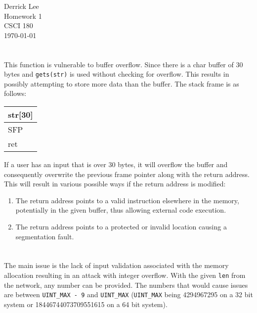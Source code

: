 \documentclass[12pt]{exam}
\begin{document}
\noindent
Derrick Lee\\
Homework 1\\
CSCI 180\\
\today\\

\section{}

This function is vulnerable to buffer overflow. Since there is a char buffer of
30 bytes and \lstinline{gets(str)} is used without checking for overflow.  This
results in possibly attempting to store more data than the buffer. The stack
frame is as follows:

\begin{table}[h]
\centering
\begin{tabular}{| l |}
\hline
str{[}30{]} \\ \hline
SFP         \\ \hline
ret         \\ \hline
\end{tabular}
\end{table}

If a user has an input that is over 30 bytes, it will overflow the buffer and
consequently overwrite the previous frame pointer along with the return address.
This will result in various possible ways if the return address is modified:

\begin{enumerate}
    \item The return address points to a valid instruction elsewhere in the
          memory, potentially in the given buffer, thus allowing external code
          execution.
    \item The return address points to a protected or invalid location causing
          a segmentation fault.
\end{enumerate}

\section{}

The main issue is the lack of input validation associated with the memory
allocation resulting in an attack with integer overflow.  With the given
\lstinline{len} from the network, any number can be provided.  The numbers that
would cause issues are between \lstinline{UINT_MAX - 9} and \lstinline{UINT_MAX}
(\lstinline{UINT_MAX} being 4294967295 on a 32 bit system or
18446744073709551615 on a 64 bit system).  
\end{document}
